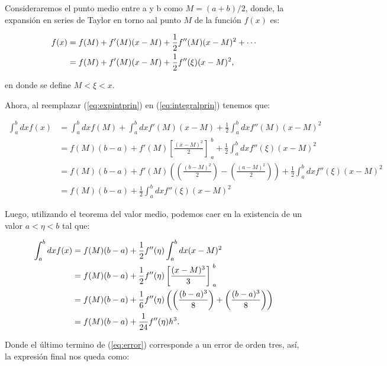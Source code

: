\documentclass[../portafolio.tex]{subfiles}
\begin{document}
Consideraremos el punto medio entre a y b como $M = (a+b)/2$, donde, la expansión en series de Taylor en torno aal punto $M$ de la función $f(x)$ es:

\begin{align}
   f(x)  & = f(M) + f'(M)(x-M) + \frac{1}{2} f''(M)(x-M)^{2} + \cdots \notag \\
         & = f(M) + f'(M)(x-M) + \frac{1}{2} f''(\xi)(x-M)^{2}, \label{eq:expintprin}
\end{align}

en donde se define $M < \xi < x$. 

\medskip

Ahora, al reemplazar (\ref{eq:expintprin}) en (\ref{eq:integralprin}) tenemos que:

\begin{align*}
    \int_{a}^{b} dx f(x) & = \int_{a}^{b}dx f(M) + \int_{a}^{b}dx f'(M)(x-M) + \frac{1}{2} \int_{a}^{b}dx f''(M)(x-M)^{2} \\
                         & = f(M)(b-a) + f'(M) \left[ \frac{(x-M)^{2}}{2} \right]_{\;a}^{\;b} + \frac{1}{2} \int_{a}^{b}dx f''(\xi)(x-M)^{2} \\
                         & = f(M)(b-a) + f'(M) \left( \left( \frac{(b-M)^{2}}{2} \right) - \left( \frac{(a-M)^{2}}{2} \right) \right) + \frac{1}{2} \int_{a}^{b}dx f''(\xi)(x-M)^{2} \\
                         & = f(M)(b-a) + \frac{1}{2} \int_{a}^{b}dx f''(\xi)(x-M)^{2} 
\end{align*}

Luego, utilizando el teorema del valor medio, podemos caer en la existencia de un valor $a < \eta < b$ tal que:

	\begin{align}
   		\int_{a}^{b}dx f(x) &= f(M)(b-a) + \frac{1}{2} f''(\eta) \int_{a}^{b}dx (x-M)^{2} \notag \\
        		               &= f(M)(b-a) + \frac{1}{2} f''(\eta) \left[ \frac{(x-M)^{3}}{3} \right]_{\;a}^{\;b} \notag \\
            		           &= f(M)(b-a) + \frac{1}{6} f''(\eta) \left( \left( \frac{(b-a)^{3}}{8} \right) + \left( \frac{(b-a)^{3}}{8} \right) \right) \notag \\
                		       &= f(M)(b-a) + \frac{1}{24} f''(\eta) h^{3}. \label{eq:error}
	\end{align}

Donde el \'ultimo termino de (\ref{eq:error}) corresponde a un error de orden tres, as\'i, la expresión final nos queda como:
\end{document}
